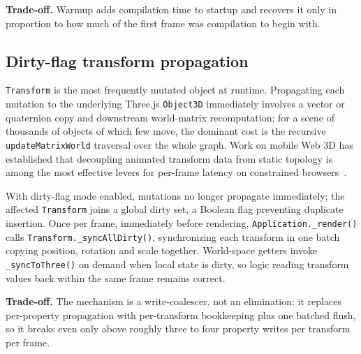 \textbf{Trade-off.} Warmup adds compilation time to startup and recovers it only in proportion to how much of the first frame was compilation to begin with.

\subsection{Dirty-flag transform propagation}
\texttt{Transform} is the most frequently mutated object at runtime. Propagating each mutation to the underlying Three.js \texttt{Object3D} immediately involves a vector or quaternion copy and downstream world-matrix recomputation; for a scene of thousands of objects of which few move, the dominant cost is the recursive \texttt{updateMatrixWorld} traversal over the whole graph. Work on mobile Web 3D has established that decoupling animated transform data from static topology is among the most effective levers for per-frame latency on constrained browsers~\cite{Li2020}.

With dirty-flag mode enabled, mutations no longer propagate immediately; the affected \texttt{Transform} joins a global dirty set, a Boolean flag preventing duplicate insertion. Once per frame, immediately before rendering, \texttt{Application.\allowbreak\_render()} calls \texttt{Transform.\allowbreak\_syncAllDirty()}, synchronizing each transform in one batch copying position, rotation and scale together. World-space getters invoke \texttt{\_syncToThree()} on demand when local state is dirty, so logic reading transform values back within the same frame remains correct.

\textbf{Trade-off.} The mechanism is a write-coalescer, not an elimination: it replaces per-property propagation with per-transform bookkeeping plus one batched flush, so it breaks even only above roughly three to four property writes per transform per frame.